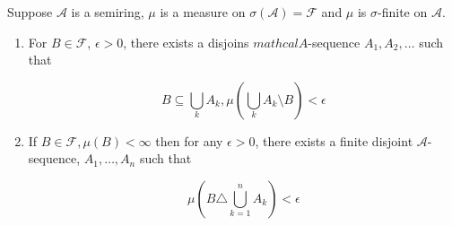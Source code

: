 \documentclass[11pt,fleqn]{book} %
\begin{document}
\begin{theorem}
	Suppose $\mathcal{A}$ is a semiring, $\mu$ is a measure on $\sigma(\mathcal{A}) = \mathcal{F}$ and $\mu$ is $\sigma$-finite on $\mathcal{A}$.

		\begin{enumerate}
			\item For $B \in \mathcal{F}$, $\epsilon > 0$, there exists a disjoins $mathcal{A}$-sequence $A_1, A_2, \dots$ such that

					$$B \subseteq \bigcup_k A_k, \mu(\bigcup_k A_k \setminus B) < \epsilon $$

			\item If $B \in \mathcal{F}, \mu(B) < \infty$ then for any $\epsilon > 0$, there exists a finite disjoint $\mathcal{A}$-sequence, $A_1, \dots, A_n$ such that

					$$\mu(B \triangle \bigcup^n_{k=1} A_k ) < \epsilon $$
		\end{enumerate}
	
\end{theorem}
\end{document}
